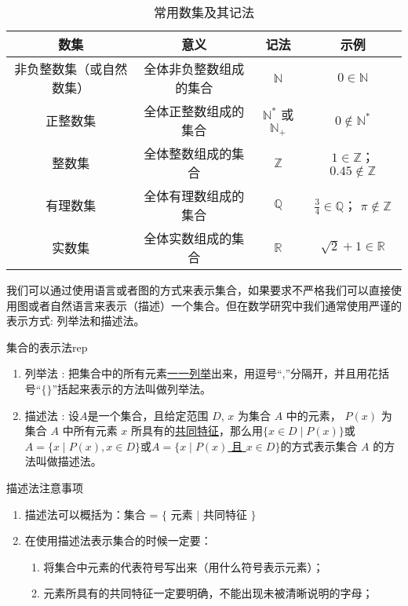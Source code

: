\begin{table}[htbp]
  \caption{常用数集及其记法\label{tab:color thm}}
  \centering
  \begin{tabular}{cccc}
  \toprule
              数集
              & 意义
              & 记法
              & 示例\\
  \midrule
              非负整数集（或自然数集） 
              & 全体非负整数组成的集合 
              & $\mathbb{N}$
              & $0 \in \mathbb{N}$ \\
              正整数集
              & 全体正整数组成的集合 
              & $\mathbb{N}^*$ 或$\mathbb{N}_+$
              & $0 \notin \mathbb{N}^*$ \\
              整数集
              & 全体整数组成的集合 
              & $\mathbb{Z}$
              & $1 \in \mathbb{Z}$； $0.45 \notin \mathbb{Z}$\\
              有理数集
              & 全体有理数组成的集合 
              & $\mathbb{Q}$
              & $\displaystyle \frac{3}{4} \in \mathbb{Q}$； $\pi \notin \mathbb{Z}$\\
              实数集
              & 全体实数组成的集合 
              & $\mathbb{R}$
              & $\sqrt{2}+1 \in \mathbb{R}$ \\
  \bottomrule
  \end{tabular}
\end{table}


我们可以通过使用语言或者图的方式来表示集合，如果要求不严格我们可以直接使用图或者自然语言来表示（描述）一个集合。但在数学研究中我们通常使用严谨的表示方式: 列举法和描述法。

\begin{definition}{集合的表示法}{rep}
	\begin{enumerate}
	  \item 列举法 : 把集合中的所有元素\underline{一一列举}出来，用逗号“,”分隔开，并且用花括号“$\{\}$”括起来表示的方法叫做列举法。
	  \item 描述法 : 设$A$是一个集合，且给定范围 $D$, $x$ 为集合 $A$ 中的元素， $P(x)$ 为集合 $A$ 中所有元素 $x$ 所具有的\underline{共同特征}，那么用\underline{$\{x\in D \mid P(x)\}$}或\underline{$A=\{x \mid P(x), x \in D \}$}或\underline{$A=\{x \mid P(x)$ 且 $ x \in D \}$}的方式表示集合 $A$ 的方法叫做描述法。
	\end{enumerate}
\end{definition}

\begin{note}{描述法注意事项}
	\begin{enumerate}
	  \item 描述法可以概括为：集合 = $\{$ 元素 $\mid$ 共同特征 $\}$
	  \item 在使用描述法表示集合的时候一定要： 
	  \begin{enumerate}
	    \item 将集合中元素的代表符号写出来（用什么符号表示元素）；
	    \item 元素所具有的共同特征一定要明确，不能出现未被清晰说明的字母；
	  \end{enumerate}
	\end{enumerate}
\end{note}


